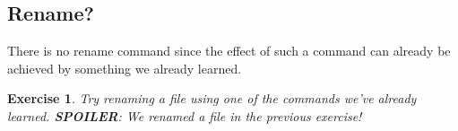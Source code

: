 \documentclass[oneside]{book}
\newcommand{\commandline}[1]{\begin{center} \colorbox{Dark}{\textcolor{white}{#1}} \end{center}}
\newtheorem{ex}{Exercise}[chapter]
\begin{document}
\subsection{Rename?}
There is no rename command since the effect of such a command can already be achieved by something we already learned.
\vspace{0.3cm}

\begin{ex}
	Try renaming a file using one of the commands we've already learned. \textbf{SPOILER}: We renamed a file in the previous exercise!
\end{ex}	

\end{document}
